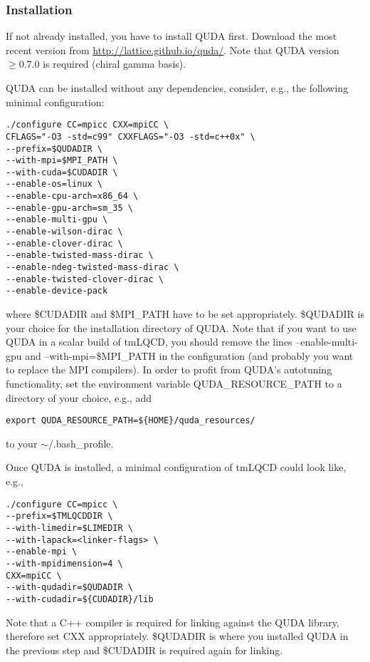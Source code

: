 \subsubsection{Installation}
If not already installed, you have to install QUDA first. Download the most recent version from \url{http://lattice.github.io/quda/}. Note that QUDA version $\geq 0.7.0$ is required (chiral gamma basis).

QUDA can be installed without any dependencies, consider, e.g., the following minimal configuration:

\begin{verbatim}
./configure CC=mpicc CXX=mpiCC \
CFLAGS="-O3 -std=c99" CXXFLAGS="-O3 -std=c++0x" \
--prefix=$QUDADIR \
--with-mpi=$MPI_PATH \
--with-cuda=$CUDADIR \
--enable-os=linux \
--enable-cpu-arch=x86_64 \
--enable-gpu-arch=sm_35 \
--enable-multi-gpu \
--enable-wilson-dirac \
--enable-clover-dirac \
--enable-twisted-mass-dirac \
--enable-ndeg-twisted-mass-dirac \
--enable-twisted-clover-dirac \
--enable-device-pack
\end{verbatim}
where {\ttfamily \$CUDADIR} and {\ttfamily \$MPI\_PATH} have to be set appropriately.
{\ttfamily \$QUDADIR} is your choice for the installation directory of QUDA.
Note that if you want to use QUDA in a scalar build of tmLQCD, you should remove the lines {\ttfamily --enable-multi-gpu} and {\ttfamily --with-mpi=\$MPI\_PATH} in the configuration (and probably you want to replace the MPI compilers).
In order to profit from QUDA's autotuning functionality, set the environment variable {\ttfamily QUDA\_RESOURCE\_PATH} to a directory of your choice, e.g., add
\begin{verbatim}
export QUDA_RESOURCE_PATH=${HOME}/quda_resources/
\end{verbatim}
to your {\ttfamily $\sim$/.bash\_profile}.

Once QUDA is installed, a minimal configuration of tmLQCD could look like, e.g.,
\begin{verbatim}
./configure CC=mpicc \
--prefix=$TMLQCDDIR \
--with-limedir=$LIMEDIR \
--with-lapack=<linker-flags> \
--enable-mpi \
--with-mpidimension=4 \
CXX=mpiCC \
--with-qudadir=$QUDADIR \
--with-cudadir=${CUDADIR}/lib
\end{verbatim}
Note that a {\ttfamily C++} compiler is required for linking against the QUDA library, therefore set {\ttfamily CXX} appropriately. {\ttfamily \${QUDADIR}} is where you installed QUDA in the previous step and {\ttfamily \${CUDADIR}} is required again for linking.

